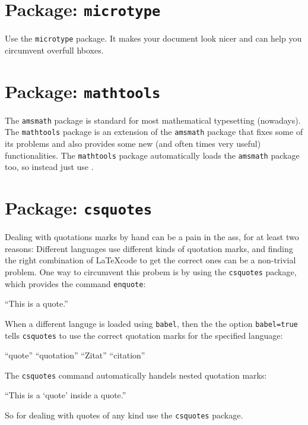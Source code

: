 \documentclass[a4paper, 10pt, abstract=on, headings=standardclasses]{scrartcl}
\begin{document}
\section{Package: \texttt{microtype}}

Use the \texttt{microtype} package.
It makes your document look nicer and can help you circumvent overfull hboxes.





\section{Package: \texttt{mathtools}}

The \texttt{amsmath} package is standard for most mathematical typesetting (nowadays).
The \texttt{mathtools} package is an extension of the \texttt{amsmath} package that fixes some of its problems and also provides some new (and often times very useful) functionalities.
The \texttt{mathtools} package automatically loads the \texttt{amsmath} package too, so instead  just use .





\section{Package: \texttt{csquotes}}

Dealing with quotations marks by hand can be a pain in the ass, for at least two reasons:
Different languages use different kinds of quotation marks, and finding the right combination of \LaTeX code to get the correct ones can be a non-trivial problem.
One way to circumvent this probem is by using the \texttt{csquotes} package, which provides the command \texttt{enquote}:
\begin{LTXexample}[pos = r]
  \enquote{This is a quote.}
\end{LTXexample}
When a different languge is loaded using \texttt{babel}, then the the option \texttt{babel=true} tells \texttt{csquotes} to use the correct quotation marks for the specified language:
\begin{LTXexample}[pos=r]
  \enquote{quote}
  \enquote{quotation}
  \enquote{Zitat}
  \enquote{citation}
\end{LTXexample}
The \texttt{csquotes} command automatically handels nested quotation marks:
\begin{LTXexample}[pos = r]
  \enquote{This is a \enquote{quote} inside a quote.}
\end{LTXexample}
So for dealing with quotes of any kind use the \texttt{csquotes} package.
\end{document}
